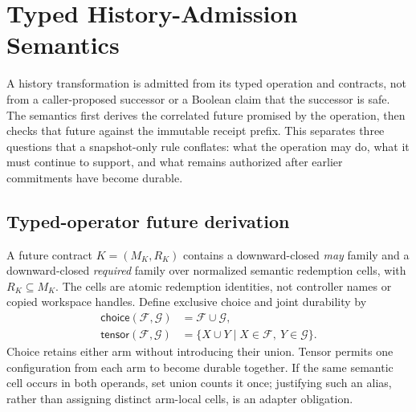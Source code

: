 \section{Typed History-Admission Semantics}
\label{sec:semantics}

A history transformation is admitted from its typed operation and contracts,
not from a caller-proposed successor or a Boolean claim that the successor is
safe.  The semantics first derives the correlated future promised by the
operation, then checks that future against the immutable receipt prefix.  This
separates three questions that a snapshot-only rule conflates: what the
operation may do, what it must continue to support, and what remains authorized
after earlier commitments have become durable.

\subsection{Typed-operator future derivation}

A future contract $K=(M_K,R_K)$ contains a downward-closed
\emph{may} family and a downward-closed \emph{required} family over normalized
semantic redemption cells, with
$R_K\subseteq M_K$.
The cells are atomic redemption identities, not controller names or copied
workspace handles.  Define exclusive choice and joint durability by
\begin{align*}
  \mathsf{choice}(\mathcal F,\mathcal G)
    &= \mathcal F\cup\mathcal G,\\
  \mathsf{tensor}(\mathcal F,\mathcal G)
    &= \{X\cup Y\mid X\in\mathcal F,\ Y\in\mathcal G\}.
\end{align*}
Choice retains either arm without introducing their union.  Tensor permits one
configuration from each arm to become durable together.  If the same semantic
cell occurs in both operands, set union counts it once; justifying such an
alias, rather than assigning distinct arm-local cells, is an adapter
obligation.


